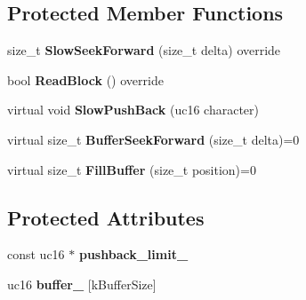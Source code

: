 \subsection*{Protected Member Functions}
\begin{DoxyCompactItemize}
\item 
size\+\_\+t {\bfseries Slow\+Seek\+Forward} (size\+\_\+t delta) override\hypertarget{classv8_1_1internal_1_1_buffered_utf16_character_stream_a28f6655afe134d979eccafe2611b348a}{}\label{classv8_1_1internal_1_1_buffered_utf16_character_stream_a28f6655afe134d979eccafe2611b348a}

\item 
bool {\bfseries Read\+Block} () override\hypertarget{classv8_1_1internal_1_1_buffered_utf16_character_stream_a9ea1f68533077b120b82859ce38675ee}{}\label{classv8_1_1internal_1_1_buffered_utf16_character_stream_a9ea1f68533077b120b82859ce38675ee}

\item 
virtual void {\bfseries Slow\+Push\+Back} (uc16 character)\hypertarget{classv8_1_1internal_1_1_buffered_utf16_character_stream_a1f213deb00e34d6ae575b9b0c7538295}{}\label{classv8_1_1internal_1_1_buffered_utf16_character_stream_a1f213deb00e34d6ae575b9b0c7538295}

\item 
virtual size\+\_\+t {\bfseries Buffer\+Seek\+Forward} (size\+\_\+t delta)=0\hypertarget{classv8_1_1internal_1_1_buffered_utf16_character_stream_a6f755ed0944f8f070ebbe570526e1559}{}\label{classv8_1_1internal_1_1_buffered_utf16_character_stream_a6f755ed0944f8f070ebbe570526e1559}

\item 
virtual size\+\_\+t {\bfseries Fill\+Buffer} (size\+\_\+t position)=0\hypertarget{classv8_1_1internal_1_1_buffered_utf16_character_stream_a7a69db23efd0133771057119e0a2a653}{}\label{classv8_1_1internal_1_1_buffered_utf16_character_stream_a7a69db23efd0133771057119e0a2a653}

\end{DoxyCompactItemize}
\subsection*{Protected Attributes}
\begin{DoxyCompactItemize}
\item 
const uc16 $\ast$ {\bfseries pushback\+\_\+limit\+\_\+}\hypertarget{classv8_1_1internal_1_1_buffered_utf16_character_stream_a31f75aab15c72728ec42cde8be258b02}{}\label{classv8_1_1internal_1_1_buffered_utf16_character_stream_a31f75aab15c72728ec42cde8be258b02}

\item 
uc16 {\bfseries buffer\+\_\+} \mbox{[}k\+Buffer\+Size\mbox{]}\hypertarget{classv8_1_1internal_1_1_buffered_utf16_character_stream_a05943ea5a34bca700e4e8ce7308c7b55}{}\label{classv8_1_1internal_1_1_buffered_utf16_character_stream_a05943ea5a34bca700e4e8ce7308c7b55}

\end{DoxyCompactItemize}
